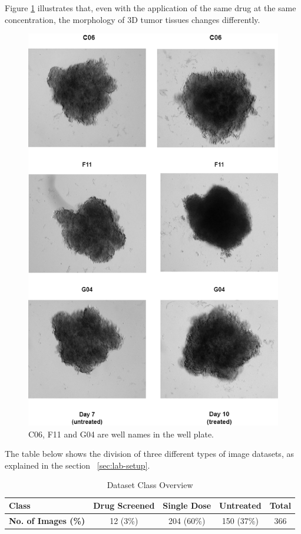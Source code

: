\documentclass[12pt,twoside,a4paper,parskip]{scrbook} %
\begin{document}
Figure \ref{fig:Transition} illustrates that, even with the application of the same drug at the same concentration, the morphology of 3D tumor tissues changes differently.
\begin{figure}[H]
  \centering
  \includegraphics[scale=0.46]{figures/transition.png} 
  \caption{C06, F11 and G04 are well names in the well plate.}
  \label{fig:Transition}
\end{figure}



The table below shows the division of three different types of image datasets, as  explained in the section ~\ref{sec:lab-setup}.
\begin{table}[ht!]
  \centering
  \begin{tabular}{|l|c|c|c|c|}
  \hline
  \textbf{Class} & \textbf{Drug Screened} & \textbf{Single Dose} & \textbf{Untreated} & \textbf{Total} \\ \hline
  \textbf{No. of Images (\%)}  & 12 (3\%) & 204 (60\%) & 150 (37\%) & 366 \\ \hline
  \end{tabular}
  \caption{Dataset Class Overview}
  \label{tab:dataset}
\end{table}
\end{document}
